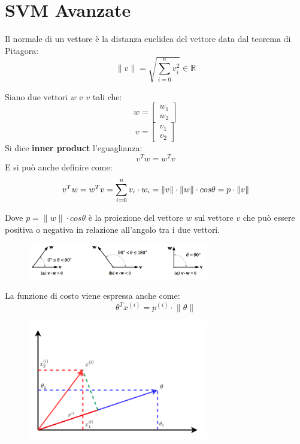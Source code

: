 \section{SVM Avanzate}
\begin{definizione}[Normale]
  Il normale di un vettore è la distanza euclidea del vettore data dal teorema di Pitagora:
  \[\lVert v\rVert = \sqrt{\sum_{i=0}^n v_i^2} \in \mathbb{R}\]
\end{definizione}
\begin{definizione}
  Siano due vettori $w$ e $v$ tali che:
    \[w = \begin{bmatrix}w_1 \\ w_2 \end{bmatrix}\]
    \[v = \begin{bmatrix}v_1 \\ v_2 \end{bmatrix}\]
    Si dice \textbf{inner product} l'eguaglianza:
    \[v^Tw = w^Tv\]
    E si può anche definire come:
\[v^Tw = w^Tv = \sum_{i=0}^n v_i \cdot w_i \\
    = \lVert v\rVert \cdot \lVert w\rVert \cdot cos \theta = p \cdot \lVert v\rVert
\]
\begin{nota}
Dove $p=\lVert w\rVert \cdot cos \theta$ è la proiezione del vettore $w$ sul vettore $v$ che può essere positiva o negativa in relazione all'angolo tra i due vettori.
\begin{figure}[H]
    \centering
    \includegraphics[width=0.7\textwidth]{img/fig-6-dot-product.jpg}
\end{figure}
\end{nota}
\end{definizione}
\begin{definizione}
  La funzione di costo viene espressa anche come:
  \[\theta^Tx^{(i)} = p^{(i)} \cdot \lVert \theta \rVert\]
  \begin{figure}[H]
    \centering
    \includegraphics[width=0.7\textwidth]{img/fig-7-dot-product-in-svm.png}
\end{figure}
\end{definizione}
